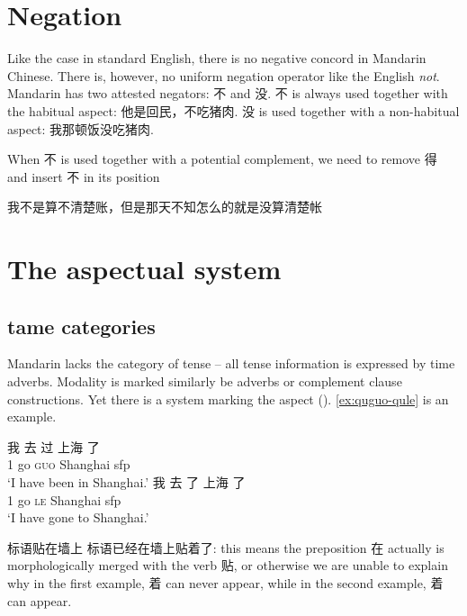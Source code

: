 \documentclass[UTF8, a4paper, oneside, scheme=plain, 12pt]{ctexrep}
\newcommand{\asis}[1]{\textsc{#1}}
\newcommand{\translate}[1]{`#1'}
\begin{document}
\section{Negation}

Like the case in standard English, 
there is no negative concord in Mandarin Chinese.
There is, however, no uniform negation operator like the English \emph{not}. 
Mandarin has two attested negators: 不 and 没.
不 is always used together with the habitual aspect:
他是回民，不吃猪肉.
没 is used together with a non-habitual aspect:
我那顿饭没吃猪肉.

When 不 is used together with a potential complement, 
we need to remove 得 and insert 不 in its position

我不是算不清楚账，但是那天不知怎么的就是没算清楚帐

\section{The aspectual system}\label{sec:aspectual}

\subsection{\acs{tame} categories}

Mandarin lacks the category of tense -- 
all tense information is expressed by time adverbs.
Modality is marked similarly be adverbs or complement clause constructions.
Yet there is a system marking the aspect (). 
\eqref{ex:quguo-qule} is an example.

\begin{exe}
    \ex \begin{xlist}
        \ex \gll 我 去 过 上海 了 \\
        1 go \asis{guo} Shanghai \acs{sfp} \\
        \glt \translate{I have been in Shanghai.}
        \ex \gll 我 去 了 上海 了 \\
        1 go \asis{le} Shanghai \acs{sfp} \\
        \glt \translate{I have gone to Shanghai.}
    \end{xlist}
    \label{ex:quguo-qule}
\end{exe}

标语贴在墙上 标语已经在墙上贴着了: 
this means the preposition 在 actually is morphologically merged with the verb 贴, 
or otherwise we are unable to explain why 
in the first example, 着 can never appear, 
while in the second example, 着 can appear.
\end{document}
